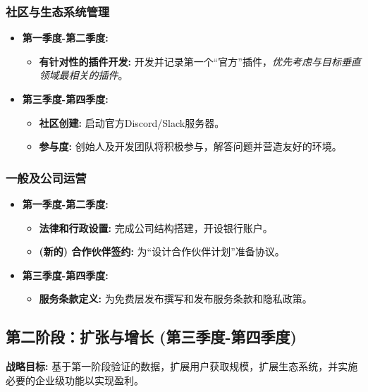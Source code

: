\documentclass[11pt, a4paper, oneside]{article}
\begin{document}
\subsubsection{社区与生态系统管理}
\begin{itemize}[leftmargin=*]
    \item \textbf{第一季度-第二季度:}
    \begin{itemize}
        \item \textbf{有针对性的插件开发:} 开发并记录第一个“官方”插件，\textit{优先考虑与目标垂直领域最相关的插件}。
    \end{itemize}
    \item \textbf{第三季度-第四季度:}
    \begin{itemize}
        \item \textbf{社区创建:} 启动官方Discord/Slack服务器。
        \item \textbf{参与度:} 创始人及开发团队将积极参与，解答问题并营造友好的环境。
    \end{itemize}
\end{itemize}

\subsubsection{一般及公司运营}
\begin{itemize}[leftmargin=*]
    \item \textbf{第一季度-第二季度:}
    \begin{itemize}
        \item \textbf{法律和行政设置:} 完成公司结构搭建，开设银行账户。
        \item \textbf{(新的) 合作伙伴签约:} 为“设计合作伙伴计划”准备协议。
    \end{itemize}
    \item \textbf{第三季度-第四季度:}
    \begin{itemize}
        \item \textbf{服务条款定义:} 为免费层发布撰写和发布服务条款和隐私政策。
    \end{itemize}
\end{itemize}

\clearpage

\subsection{第二阶段：扩张与增长 (第三季度-第四季度)}
\textbf{战略目标:} 基于第一阶段验证的数据，扩展用户获取规模，扩展生态系统，并实施必要的企业级功能以实现盈利。
\end{document}

